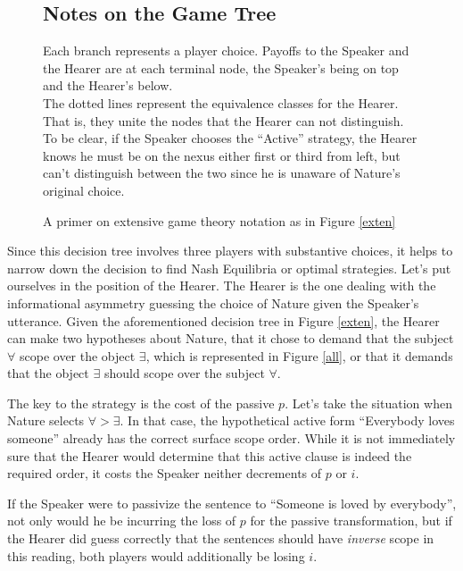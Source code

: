 \documentclass{article}
\begin{document}
\begin{figure}
	\begin{shaded}
		\small
		\subsection*{Notes on the Game Tree}
Each branch represents a player choice. Payoffs to the Speaker and the Hearer are at each terminal node, the Speaker's being on top and the Hearer's below.\\

The dotted lines represent the equivalence classes for the Hearer. That is, they unite the nodes that the Hearer can not distinguish. To be clear, if the Speaker chooses the ``Active'' strategy, the Hearer knows he must be on the nexus either first or third from left, but can't distinguish between the two since he is unaware of Nature's original choice.
	\caption{A primer on extensive game theory notation as in Figure \ref{exten}\label{expl}}
	\end{shaded}
\end{figure}


Since this decision tree involves three players with substantive choices, it helps to narrow down the decision to find Nash Equilibria or optimal strategies.
Let's put ourselves in the position of the Hearer.
The Hearer is the one dealing with the informational asymmetry guessing the choice of Nature given the Speaker's utterance.
Given the aforementioned decision tree in Figure \ref{exten}, the Hearer can make two hypotheses about Nature, that it chose to demand that the subject $\forall$ scope over the object $\exists$, which is represented in Figure \ref{all}, or that it demands that the object $\exists$ should scope over the subject $\forall$.

The key to the strategy is the cost of the passive $p$.
Let's take the situation when Nature selects ${\forall}>{\exists}$.
In that case, the hypothetical active form ``Everybody loves someone'' already has the correct surface scope order.
While it is not immediately sure that the Hearer would determine that this active clause is indeed the required order, it costs the Speaker neither decrements of $p$ or $i$.

If the Speaker were to passivize the sentence to ``Someone is loved by everybody'', not only would he be incurring the loss of $p$ for the passive transformation, but if the Hearer did guess correctly that the sentences should have \emph{inverse} scope in this reading, both players would additionally be losing $i$.
\end{document}
